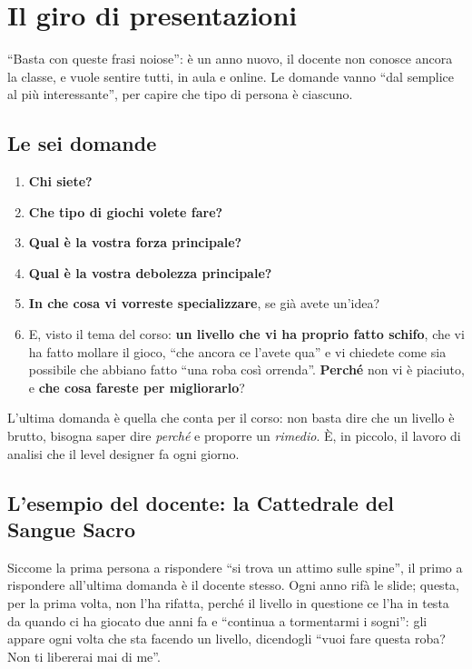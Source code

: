 \section{Il giro di presentazioni}
\label{gd8:sec:presentazioni}

``Basta con queste frasi noiose'': è un anno nuovo, il docente non conosce
ancora la classe, e vuole sentire tutti, in aula e online. Le domande vanno
``dal semplice al più interessante'', per capire che tipo di persona è
ciascuno.

\subsection{Le sei domande}

\begin{enumerate}
  \item \textbf{Chi siete?}
  \item \textbf{Che tipo di giochi volete fare?}
  \item \textbf{Qual è la vostra forza principale?}
  \item \textbf{Qual è la vostra debolezza principale?}
  \item \textbf{In che cosa vi vorreste specializzare}, se già avete
        un'idea?
  \item E, visto il tema del corso: \textbf{un livello che vi ha proprio
        fatto schifo}, che vi ha fatto mollare il gioco, ``che ancora ce
        l'avete qua'' e vi chiedete come sia possibile che abbiano fatto
        ``una roba così orrenda''. \textbf{Perché} non vi è piaciuto, e
        \textbf{che cosa fareste per migliorarlo}?
\end{enumerate}

L'ultima domanda è quella che conta per il corso: non basta dire che un
livello è brutto, bisogna saper dire \emph{perché} e proporre un
\emph{rimedio}. È, in piccolo, il lavoro di analisi che il level designer fa
ogni giorno.

\subsection{L'esempio del docente: la Cattedrale del Sangue Sacro}

Siccome la prima persona a rispondere ``si trova un attimo sulle spine'',
il primo a rispondere all'ultima domanda è il docente stesso. Ogni anno rifà
le slide; questa, per la prima volta, non l'ha rifatta, perché il livello in
questione ce l'ha in testa da quando ci ha giocato due anni fa e ``continua a
tormentarmi i sogni'': gli appare ogni volta che sta facendo un livello,
dicendogli ``vuoi fare questa roba? Non ti libererai mai di me''.


